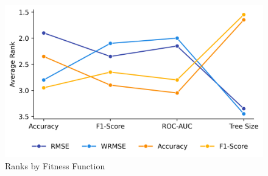 
    \begin{figure}[H]
    \centering
    \includegraphics[width=\linewidth]{../Latex/Chapters/Figures/Results/fitness_ranks.png}
    \caption{Ranks by Fitness Function}
    \label{fig:fitness_ranks}
    \end{figure}
    